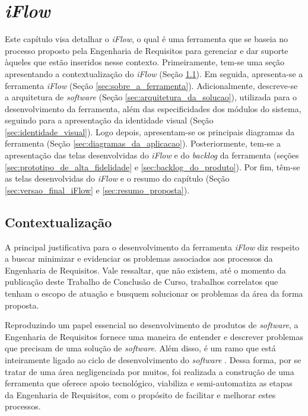 \chapter[\textit{iFlow}]{\textit{iFlow}}

\label{chap:proposta}

Este capítulo visa detalhar o \textit{iFlow}, o qual é uma ferramenta que se baseia no processo proposto pela Engenharia de Requisitos para gerenciar e dar suporte àqueles que estão inseridos nesse contexto. Primeiramente, tem-se uma seção apresentando a contextualização do \textit{iFlow} (Seção \ref{sec:contextualizacao}). Em seguida, apresenta-se a ferramenta \textit{iFlow} (Seção \ref{sec:sobre_a_ferramenta}). Adicionalmente, descreve-se a arquitetura de \textit{software} (Seção \ref{sec:arquitetura_da_solucao}), utilizada para o desenvolvimento da ferramenta, além das especificidades dos módulos do sistema, seguindo para a apresentação da identidade visual (Seção \ref{sec:identidade_visual}). Logo depois, apresentam-se os principais diagramas da ferramenta (Seção \ref{sec:diagramas_da_aplicacao}). Posteriormente, tem-se a apresentação das telas desenvolvidas do \textit{iFlow} e do \textit{backlog} da ferramenta (seções \ref{sec:prototipo_de_alta_fidelidade} e \ref{sec:backlog_do_produto}). Por fim, têm-se as telas desenvolvidas do \textit{iFlow} e o resumo do capítulo (Seção \ref{sec:versao_final_iFlow} e \ref{sec:resumo_proposta}).

\section{Contextualização}

\label{sec:contextualizacao}

A principal justificativa para o desenvolvimento da ferramenta \textit{iFlow} diz respeito a buscar minimizar e evidenciar os problemas associados aos processos da Engenharia de Requisitos. Vale ressaltar, que não existem, até o momento da publicação deste Trabalho de Conclusão de Curso, trabalhos correlatos que tenham o escopo de atuação e busquem solucionar os problemas da área da forma proposta.

Reproduzindo um papel essencial no desenvolvimento de produtos de \textit{software}, a Engenharia de Requisitos fornece uma maneira de entender e descrever problemas que precisam de uma solução de \textit{software}. Além disso, é um ramo que está inteiramente ligado ao ciclo de desenvolvimento do \textit{software} \cite{elliott2012software}. Dessa forma, por se tratar de uma área negligenciada por muitos, foi realizada a construção de uma ferramenta que oferece apoio tecnológico, viabiliza e semi-automatiza as etapas da Engenharia de Requisitos, com o propósito de facilitar e melhorar estes processos.

